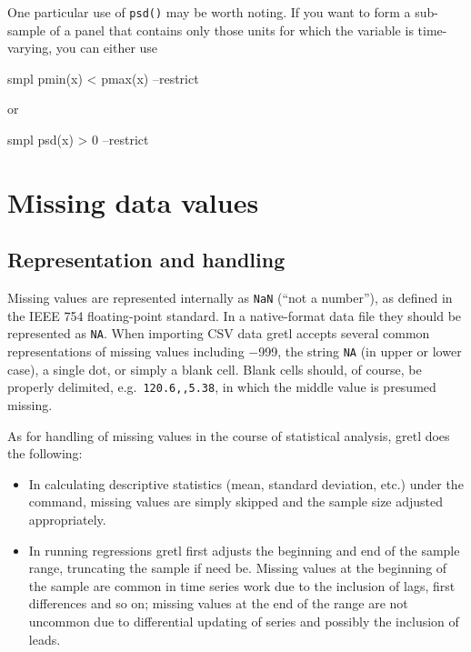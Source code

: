 One particular use of \texttt{psd()} may be worth noting.  If you want
to form a sub-sample of a panel that contains only those units for
which the variable  is time-varying, you can either use 
%
\begin{code}
smpl pmin(x) < pmax(x) --restrict
\end{code}
or
%
\begin{code}
smpl psd(x) > 0 --restrict
\end{code}

\section{Missing data values}
\label{missing-data}

\subsection{Representation and handling}

Missing values are represented internally as \verb+NaN+ (``not a
number''), as defined in the IEEE 754 floating-point standard. In a
native-format data file they should be represented as \verb+NA+. When
importing CSV data gretl accepts several common representations of
missing values including $-$999, the string \verb+NA+ (in upper or
lower case), a single dot, or simply a blank cell.  Blank cells
should, of course, be properly delimited, e.g.\ \verb+120.6,,5.38+, in
which the middle value is presumed missing.

As for handling of missing values in the course of statistical
analysis, gretl does the following:

\begin{itemize}
\item In calculating descriptive statistics (mean, standard deviation,
  etc.) under the  command, missing values are simply
  skipped and the sample size adjusted appropriately.
\item In running regressions gretl first adjusts the beginning
  and end of the sample range, truncating the sample if need be.
  Missing values at the beginning of the sample are common in time
  series work due to the inclusion of lags, first differences and so
  on; missing values at the end of the range are not uncommon due to
  differential updating of series and possibly the inclusion of leads.
\end{itemize}

